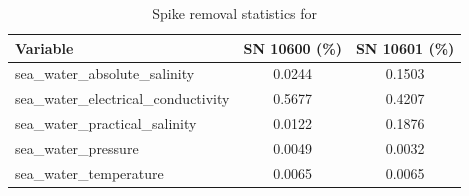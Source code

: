 \begin{table}[h]
\centering
\caption{Spike removal statistics for \projectname{} \casenumber{}}
\label{tab:spike_stats}
\begin{tabular}{|l|c|c|}
\hline
Variable & SN 10600 (\%) & SN 10601 (\%) \\
\hline
sea\_water\_absolute\_salinity & 0.0244 & 0.1503 \\
sea\_water\_electrical\_conductivity & 0.5677 & 0.4207 \\
sea\_water\_practical\_salinity & 0.0122 & 0.1876 \\
sea\_water\_pressure & 0.0049 & 0.0032 \\
sea\_water\_temperature & 0.0065 & 0.0065 \\
\hline
\end{tabular}
\end{table}
